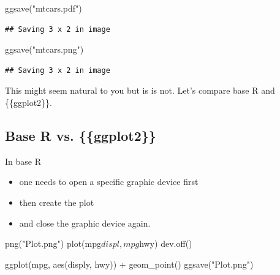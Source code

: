 \documentclass[]{book}
\newenvironment{Shaded}{}{}
\newcommand{\KeywordTok}[1]{\textcolor[rgb]{0.00,0.00,1.00}{#1}}
\newcommand{\NormalTok}[1]{#1}
\newcommand{\OperatorTok}[1]{#1}
\newcommand{\StringTok}[1]{\textcolor[rgb]{0.00,0.50,0.50}{#1}}
\begin{document}
\begin{Shaded}
\begin{Highlighting}[]
\KeywordTok{ggsave}\NormalTok{(}\StringTok{"mtcars.pdf"}\NormalTok{)}
\end{Highlighting}
\end{Shaded}

\begin{verbatim}
## Saving 3 x 2 in image
\end{verbatim}

\begin{Shaded}
\begin{Highlighting}[]
\KeywordTok{ggsave}\NormalTok{(}\StringTok{"mtcars.png"}\NormalTok{)}
\end{Highlighting}
\end{Shaded}

\begin{verbatim}
## Saving 3 x 2 in image
\end{verbatim}

This might seem natural to you but is is not.
Let's compare base R and \{\{ggplot2\}\}.

\hypertarget{base-r-vs.-ggplot2}{%
\subsection{Base R vs. \{\{ggplot2\}\}}\label{base-r-vs.-ggplot2}}

In base R

\begin{itemize}
\item
  one needs to open a specific graphic device first
\item
  then create the plot
\item
  and close the graphic device again.
\end{itemize}

\begin{Shaded}
\begin{Highlighting}[]
\KeywordTok{png}\NormalTok{(}\StringTok{"Plot.png"}\NormalTok{)}
\KeywordTok{plot}\NormalTok{(mpg}\OperatorTok{$}\NormalTok{displ, mpg}\OperatorTok{$}\NormalTok{hwy)}
\KeywordTok{dev.off}\NormalTok{()}
\end{Highlighting}
\end{Shaded}

\begin{Shaded}
\begin{Highlighting}[]
\KeywordTok{ggplot}\NormalTok{(mpg, }\KeywordTok{aes}\NormalTok{(disply, hwy)) }\OperatorTok{+}
\StringTok{  }\KeywordTok{geom_point}\NormalTok{()}
\KeywordTok{ggsave}\NormalTok{(}\StringTok{"Plot.png"}\NormalTok{)}
\end{Highlighting}
\end{Shaded}
\end{document}
